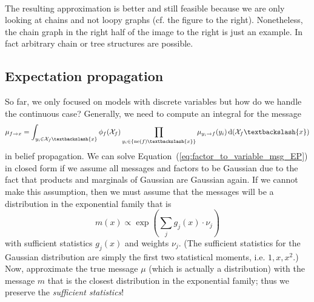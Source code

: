 \begin{minipage}[t]{1\textwidth}
	\begin{minipage}[t]{.48\textwidth}
		~\\[.75cm]
		The resulting approximation is better and still feasible because we are only looking at chains and not loopy graphs (cf. the figure to the right). %
		Nonetheless, the chain graph in the right half of the image to the right is just an example. %
		In fact arbitrary chain or tree structures are possible. %
	\end{minipage}
	\hfill
	\begin{minipage}[t]{.48\textwidth}
		\vspace*{.25cm}
		\begin{figure}[H]
		\centering{}
		\end{figure}
	\end{minipage}
\end{minipage}
%
%
%
\subsection{Expectation propagation}
So far, we only focused on models with discrete variables but how do we handle the continuous case? %
Generally, we need to compute an integral for the message %
\begin{equation}
\mu_{f\rightarrow x} = %
\int_{y_i\in\mathcal{X}_f\textbackslash\{x\}} \phi_f(\mathcal{X}_f) %
\prod_{y_i \in \{ \NE(f)\textbackslash\{x\} \} } \mu_{y_i \rightarrow f}(y_i) \, \mathrm{d}(\mathcal{X}_f\textbackslash\{x\})
\label{eq:factor_to_variable_msg_EP}
\end{equation}
in belief propagation. %
We can solve Equation~(\ref{eq:factor_to_variable_msg_EP}) in closed form if we assume all messages and factors to be Gaussian due to the fact that products and marginals of Gaussian are Gaussian again. %
If we cannot make this assumption, then we must assume that the messages will be a distribution in the exponential family that is %
\begin{equation*}
m(x) \propto \exp\left( \sum_j g_j(x) \cdot \nu_j \right)
\end{equation*}
with sufficient statistics \ensuremath{g_j(x)} and weights \ensuremath{\nu_j}. %
(The sufficient statistics for the Gaussian distribution are simply the first two statistical moments, i.e. \ensuremath{1,x,x^2}.) %
Now, approximate the true message \ensuremath{\mu} (which is actually a distribution) with the message \ensuremath{m} that is the closest distribution in the exponential family; thus we preserve the \emph{sufficient statistics}! %

